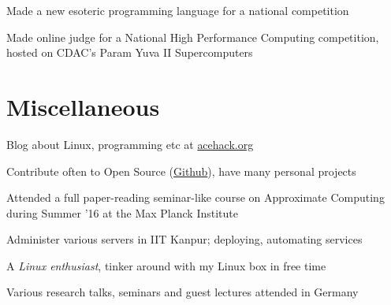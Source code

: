 \documentclass[a4paper]{deedy-resume} %
\newcommand{\onepage}[1]{
  \ifdefined\onep
  #1
  \fi
}
\begin{document}
\begin{minipage}[t]{0.66\textwidth}
  \sectionspace

  \runsubsection{}
  \begin{tightitemize}
    \item Made a new esoteric programming language for a national
      competition
    \item Made online judge for a National High Performance Computing competition, hosted on CDAC’s Param Yuva II Supercomputers
  \end{tightitemize}

  \section{Miscellaneous}
  \vspace{\topsep}
  \begin{tightitemize}
  \item Blog about Linux, programming etc at
    \href{http://acehack.org}{acehack.org}
  \item Contribute often to Open Source
    (\href{https://github.com/sakshamsharma}{Github}), have many
    personal projects
  \item	Attended a full paper-reading seminar-like course on
    Approximate Computing during Summer ’16 at the Max Planck
    Institute
  \item Administer \onepage{various} servers in IIT Kanpur; deploying,
    automating services
  \item A \textit{Linux enthusiast}, tinker around with my Linux box
    in free time
  \item Various research talks, seminars and guest lectures attended
    in Germany
  \end{tightitemize}

\end{minipage}




\end{document}
